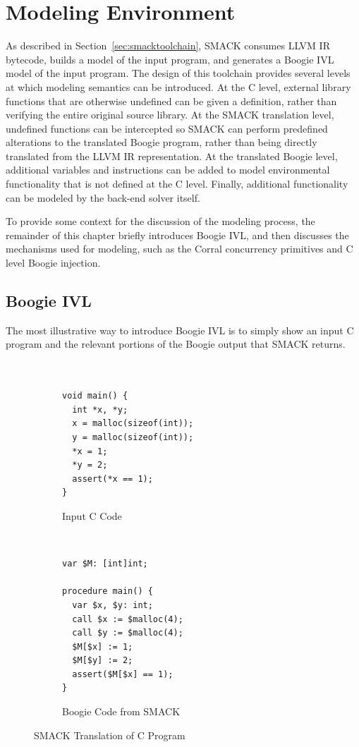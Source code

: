 \section{Modeling Environment}\label{sec:modelingenvironment}
As described in Section~\ref{sec:smacktoolchain}, SMACK consumes LLVM
IR bytecode, builds a model of the input program, and generates a
Boogie IVL model of the input program.  The design of this toolchain
provides several levels at which modeling semantics can be
introduced. At the C level, external library functions that are
otherwise undefined can be given a definition, rather than verifying
the entire original source library. At the SMACK translation level,
undefined functions can be intercepted so SMACK can perform predefined
alterations to the translated Boogie program, rather than being
directly translated from the LLVM IR representation.  At the
translated Boogie level, additional variables and instructions can be
added to model environmental functionality that is not defined at the
C level. Finally, additional functionality can be modeled by the
back-end solver itself. 

To provide some context for the discussion of the modeling process,
the remainder of this chapter briefly introduces Boogie IVL, and then
discusses the mechanisms used for modeling, such as the Corral
concurrency primitives and C level Boogie injection.

\subsection{Boogie IVL}
The most illustrative way to introduce Boogie IVL is to simply show an
input C program and the relevant portions of the Boogie output that
SMACK returns. 
\begin{figure}[!ht]
\centering
\begin{subfigure}[b]{.45\textwidth}
\centering
\begin{lstlisting}


void main() {
  int *x, *y;
  x = malloc(sizeof(int));
  y = malloc(sizeof(int));
  *x = 1;
  *y = 2;
  assert(*x == 1);
}
\end{lstlisting}
\caption{Input C Code}\label{fig:cToBoogie_a}
\end{subfigure}
~
\begin{subfigure}[b]{.45\textwidth}
\centering
\begin{lstlisting}[language=boogie]
var $M: [int]int;

procedure main() {
  var $x, $y: int;
  call $x := $malloc(4);
  call $y := $malloc(4);
  $M[$x] := 1;
  $M[$y] := 2;
  assert($M[$x] == 1);
}
\end{lstlisting}
\caption{Boogie Code from SMACK}\label{fig:cToBoogie_b}
\end{subfigure}
\caption{SMACK Translation of C Program}\label{fig:cToBoogie}
\end{figure}

